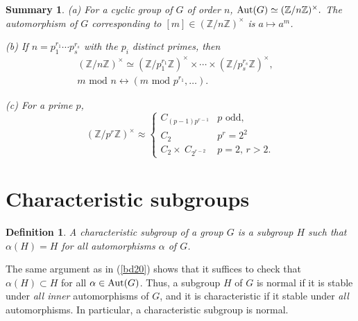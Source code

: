 \documentclass[a4paper,11pt,final,openany]{memoir}%
\newtheorem{definition}[X]{Definition}
\newtheorem{summary}[X]{Summary}
\theoremstyle{nonumberplain}
\begin{document}
\begin{summary}
\label{it10}(a) For a cyclic group of $G$ of order $n$, $\operatorname{Aut}(G)\simeq
(\mathbb{Z}{}/n\mathbb{Z}{})^{\times}.$ The automorphism of $G$ corresponding
to $[m]\in(\mathbb{Z}/n\mathbb{Z}{})^{\times}$ is $a\mapsto a^{m}$.

(b) If $n=p_{1}^{r_{1}}\cdots p_{s}^{r_{s}}$ with the $p_{i}$ distinct primes,
then%
\begin{align*}
(\mathbb{Z}/n\mathbb{Z})^{\times}\simeq(\mathbb{Z}/p_{1}^{r_{1}}%
\mathbb{Z})^{\times}\times\cdots\times(\mathbb{Z}/p_{s}^{r_{s}}\mathbb{Z}%
)^{\times},\quad\\
 m\text{ mod }n\leftrightarrow(m\text{ mod }p^{r_{1}}%
,\ldots).
\end{align*}


(c) For a prime $p$,%
\[
(\mathbb{Z}/p^{r}\mathbb{Z})^{\times}\approx%
\begin{cases}
C_{(p-1)p^{r-1}} & p\text{ odd,}\\
C_{2} & p^{r}=2^{2}\\
C_{2}\times\ C_{2^{r-2}} & p=2\text{, }r>2.
\end{cases}
\]

\end{summary}

\section{Characteristic subgroups}

\begin{definition}
\label{it11} A \emph{characteristic subgroup}%
of a group $G$ is a subgroup $H$ such that $\alpha(H)=H$ for all automorphisms
$\alpha$ of $G$.
\end{definition}

The same argument as in (\ref{bd20}) shows that it suffices to check that
$\alpha(H)\subset H$ for all $\alpha\in\operatorname{Aut}(G)$. Thus, a subgroup $H$ of $G$
is normal if it is stable under \textit{all inner} automorphisms of $G$, and
it is characteristic if it stable under \textit{all} automorphisms. In
particular, a characteristic subgroup is normal.
\end{document}
